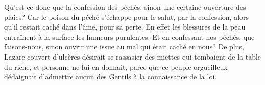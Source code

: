 Qu’est-ce donc que la confession des péchés,
	sinon une certaine ouverture des plaies?
Car le poison du péché s’échappe pour le salut, par la confession,
	alors qu’il restait caché dans l’âme, pour sa perte.
En effet les blessures de la peau
	entraînent à la surface les humeurs purulentes.
Et en confessant nos péchés, que faisons-nous,
	sinon ouvrir une issue au mal qui était caché en nous?
De plus, Lazare couvert d’ulcères
	désirait se rassasier des miettes qui tombaient de la table du riche,
	et personne ne lui en donnait,
	parce que ce peuple orgueilleux dédaignait d’admettre aucun des Gentils
		à la connaissance de la loi.
